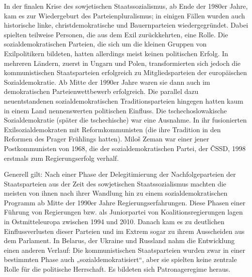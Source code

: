 \begin{multicols*}{2}
In der finalen Krise des sowjetischen Staatssozialismus, ab Ende der 1980er Jahre, kam es zur Wiedergeburt des Parteienpluralismus; in einigen Fällen wurden auch historische linke, christdemokratische und Bauernparteien wiedergegründet. Dabei spielten teilweise Personen, die aus dem Exil zurückkehrten, eine Rolle. Die sozialdemokratischen Parteien, die sich um die kleinen Gruppen von Exilpolitikern bildeten, hatten allerdings meist keinen politischen Erfolg. In mehreren Ländern, zuerst in Ungarn und Polen, transformierten sich jedoch die kommunistischen Staatsparteien erfolgreich zu Mitgliedsparteien der europäischen Sozialdemokratie. Ab Mitte der 1990er Jahre waren sie dann auch im demokratischen Parteienwettbewerb erfolgreich. Die parallel dazu neuentstandenen sozialdemokratischen Traditionsparteien hingegen hatten kaum in einem Land nennenswerten politischen Einfluss. Die tschechoslowakische Sozialdemokratie (später die tschechische) war eine Ausnahme. In ihr fusionierten Exilsozialdemokraten mit Reformkommunisten (die ihre Tradition in den Reformen des Prager Frühlings hatten). Miloš Zeman war einer jener Postkommunisten von 1968, die der sozialdemokratischen Partei, der ČSSD, 1998 erstmals zum Regierungserfolg verhalf. 

Generell gilt: Nach einer Phase der Delegitimierung der Nachfolgeparteien der Staatsparteien aus der Zeit des sowjetischen Staatssozialismus machten die meisten von ihnen nach ihrer Wandlung hin zu einem sozialdemokratischen Programm ab Mitte der 1990er Jahre Regierungserfahrungen. Diese Phasen einer Führung von Regierungen bzw. als Juniorpartei von Koalitionsregierungen lagen in Ostmitteleuropa zwischen 1994 und 2010. Danach kam es zu deutlichen Einflussverlusten dieser Parteien und im Extrem sogar zu ihrem Ausscheiden aus dem Parlament. In Belarus, der Ukraine und Russland nahm die Entwicklung einen anderen Verlauf: Die kommunistischen Staatsparteien wurden zwar in einer bestimmten Phase auch „sozialdemokratisiert“, aber sie spielten keine zentrale Rolle für die politische Herrschaft. Es bildeten sich Patronageregime heraus.
\end{multicols*}

